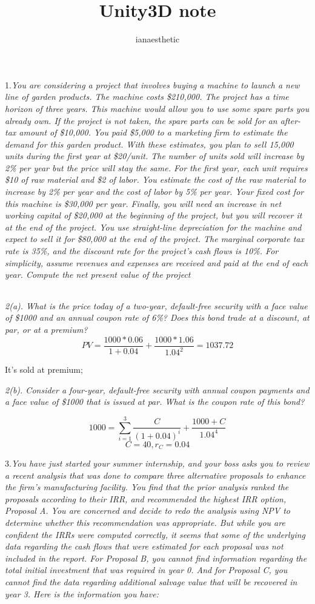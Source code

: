 \documentclass[10pt, a4paper]{article}
\author{ianaesthetic}
\title{Unity3D note}
\begin{document}
1.\emph{You are considering a project that involves buying a machine to launch a new line of garden products. The machine costs \$210,000. The project has a time horizon of three years. This machine would allow you to use some spare parts you already own. If the project is not taken, the spare parts can be sold for an after-tax amount of \$10,000. You paid \$5,000 to a marketing firm to estimate the demand for this garden product. With these estimates, you plan to sell 15,000 units during the first year at \$20/unit. The number of units sold will increase by 2\% per year but the price will stay the same. For the first year, each unit requires \$10 of raw material and \$2 of labor. You estimate the cost of the raw material to increase by 2\% per year and the cost of labor by 5\% per year. Your fixed cost for this machine is \$30,000 per year. Finally, you will need an increase in net working capital of \$20,000 at the beginning of the project, but you will recover it at the end of the project. You use straight-line depreciation for the machine and expect to sell it for \$80,000 at the end of the project. The marginal corporate tax rate is 35\%, and the discount rate for the project’s cash flows is 10\%. For simplicity, assume revenues and expenses are received and paid at the end of each year. Compute the net present value of the project}

\begin{tabular}{|r|r|r|r|r|} 
\end{tabular}

\emph{
2(a). What is the price today of a two-year, default-free security with a face value of \$1000 and an annual coupon rate of 6\%? Does this bond trade at a discount, at par, or at a premium?
}
$$PV = \frac{1000 * 0.06}{1 + 0.04} + \frac{1000 * 1.06}{1.04^2} = 1037.72$$
\begin{center}
It's sold at premium;
\end{center}


\emph{
2(b). Consider a four-year, default-free security with annual coupon payments and a face value of \$1000 that is issued at par. What is the coupon rate of this bond?
}

$$1000 = \sum_{i = 1}^{3}\frac{C}{(1 + 0.04)^i} + \frac{1000 + C}{1.04^4}$$
$$C = 40, r_C = 0.04$$

3.\emph{You have just started your summer internship, and your boss asks you to review a recent analysis that was done to compare three alternative proposals to enhance the firm’s manufacturing facility. You find that the prior analysis ranked the proposals according to their IRR, and recommended the highest IRR option, Proposal A. You are concerned and decide to redo the analysis using NPV to determine whether this recommendation was appropriate. But while you are confident the IRRs were computed correctly, it seems that some of the underlying data regarding the cash flows that were estimated for each proposal was not included in the report. For Proposal B, you cannot find information regarding the total initial investment that was required in year 0. And for Proposal C, you cannot find the data regarding additional salvage value that will be recovered in year 3. Here is the information you have:}
\end{document}
